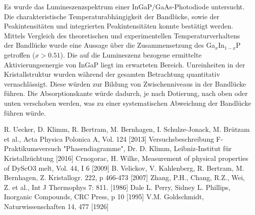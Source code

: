 \documentclass[aps,twocolumn,secnumarabic,nobalancelastpage,amsmath,amssymb,
nofootinbib,superscriptaddress]{revtex4-1}
\begin{document}
\noindent Es wurde das Lumineszenzspektrum einer InGaP/GaAs-Photodiode untersucht. Die charakteristische Temperaturabhängigkeit der
Bandlücke, sowie der Peakintensitäten und integrierten Peakintensitäten konnte bestätigt werden. Mittels Vergleich des theoretischen
und experimentellen Temperaturverhaltens der Bandlücke wurde eine Aussage über die Zusammensetzung des Ga$_x$In$_{1-x}$P getroffen
($x>0.51$). Die auf die Lumineszenz bezogene ermittelte Aktivierungsenergie von InGaP liegt im erwarteten Bereich.
Unreinheiten in der Kristallstruktur wurden während der gesamten Betrachtung quantitativ vernachlässigt. Diese würden zur Bildung
von Zwischenniveaus in der Bandlücke führen. Die Absorptionskante würde dadurch, je nach Dotierung, nach oben oder unten verschoben werden, was
zu einer systematischen Abweichung der Bandlücke führen würde.





\begin{thebibliography}{99}
R. Uecker, D. Klimm, R. Bertram, M. Bernhagen, I. Schulze-Jonack, M. Brützam et al., Acta Physica Polonica A, Vol. 124 [2013]
Versuchsbeschreibung F-Praktikumsversuch "Phasendiagramme", Dr. D. Klimm, Leibniz-Institut für Kristallzüchtung [2016]
Crnogorac, H. Wilke, Measurement of physical properties of DyScO3 melt, Vol. 44, I 6 [2009]
B. Velickov, V. Kahlenberg, R. Bertram, M. Bernhagen, Z. Kristallogr. 222, p 466-473 [2007]
Zhang, P.H., Chang, R.Z., Wei, Z. et al., Int J Thermophys 7: 811. [1986]
Dale L. Perry, Sidney L. Phillips, Inorganic Compounds, CRC Press, p 10 [1995]
V.M. Goldschmidt, Naturwissenschaften 14, 477 [1926]
\end{thebibliography}


\clearpage
\appendix

\end{document}
